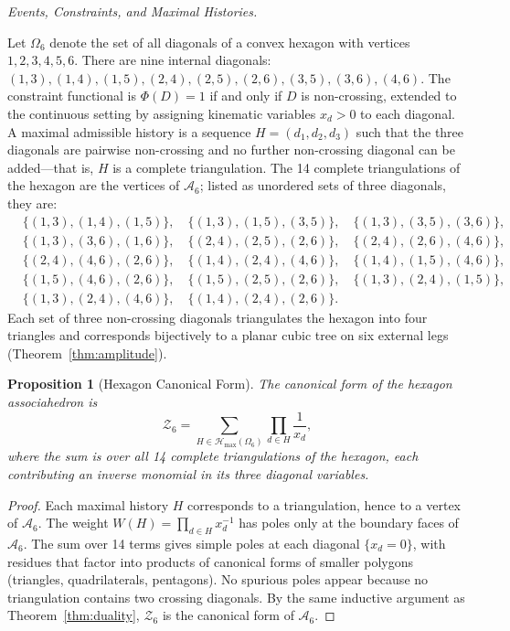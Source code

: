 \documentclass[11pt]{article}
\theoremstyle{plain}
\newtheorem{proposition}[theorem]{Proposition}
\theoremstyle{definition}
\theoremstyle{remark}
\newcommand{\Phif}{\Phi}
\newcommand{\OmKS}{\Omega}
\newcommand{\Hmax}{\mathcal{H}_{\max}}
\begin{document}
\medskip\noindent\textit{Events, Constraints, and Maximal Histories.}

Let $\OmKS_6$ denote the set of all diagonals of a convex hexagon with vertices $1, 2, 3, 4, 5, 6$. There are nine internal diagonals: $(1,3), (1,4), (1,5), (2,4), (2,5), (2,6), (3,5), (3,6), (4,6)$. The constraint functional is $\Phif(D) = 1$ if and only if $D$ is non-crossing, extended to the continuous setting by assigning kinematic variables $x_d > 0$ to each diagonal. A maximal admissible history is a sequence $H = (d_1, d_2, d_3)$ such that the three diagonals are pairwise non-crossing and no further non-crossing diagonal can be added---that is, $H$ is a complete triangulation. The 14 complete triangulations of the hexagon are the vertices of $\mathcal{A}_6$; listed as unordered sets of three diagonals, they are:
\begin{align*}
  &\{(1,3),(1,4),(1,5)\},\quad
   \{(1,3),(1,5),(3,5)\},\quad
   \{(1,3),(3,5),(3,6)\},\\
  &\{(1,3),(3,6),(1,6)\},\quad
   \{(2,4),(2,5),(2,6)\},\quad
   \{(2,4),(2,6),(4,6)\},\\
  &\{(2,4),(4,6),(2,6)\},\quad
   \{(1,4),(2,4),(4,6)\},\quad
   \{(1,4),(1,5),(4,6)\},\\
  &\{(1,5),(4,6),(2,6)\},\quad
   \{(1,5),(2,5),(2,6)\},\quad
   \{(1,3),(2,4),(1,5)\},\\
  &\{(1,3),(2,4),(4,6)\},\quad
   \{(1,4),(2,4),(2,6)\}.
\end{align*}
Each set of three non-crossing diagonals triangulates the hexagon into four triangles and corresponds bijectively to a planar cubic tree on six external legs (Theorem~\ref{thm:amplitude}).

\begin{proposition}[Hexagon Canonical Form]
\label{prop:hexagon}
The canonical form of the hexagon associahedron is
\begin{equation}
\label{eq:hexagon-Z}
  \mathcal{Z}_6 = \sum_{H \in \Hmax(\OmKS_6)} \prod_{d \in H} \frac{1}{x_d},
\end{equation}
where the sum is over all 14 complete triangulations of the hexagon, each contributing an inverse monomial in its three diagonal variables.
\end{proposition}

\begin{proof}
Each maximal history $H$ corresponds to a triangulation, hence to a vertex of $\mathcal{A}_6$. The weight $W(H) = \prod_{d \in H} x_d^{-1}$ has poles only at the boundary faces of $\mathcal{A}_6$. The sum over 14 terms gives simple poles at each diagonal $\{x_d = 0\}$, with residues that factor into products of canonical forms of smaller polygons (triangles, quadrilaterals, pentagons). No spurious poles appear because no triangulation contains two crossing diagonals. By the same inductive argument as Theorem~\ref{thm:duality}, $\mathcal{Z}_6$ is the canonical form of $\mathcal{A}_6$.
\end{proof}
\end{document}
